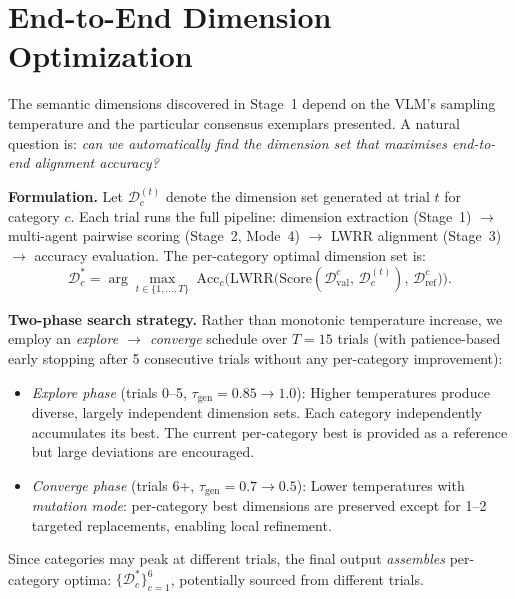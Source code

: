 \documentclass[runningheads]{llncs}
\begin{document}
\FloatBarrier
\section{End-to-End Dimension Optimization}
\label{sec:e2e}

The semantic dimensions discovered in Stage~1 depend on the VLM's sampling temperature and the particular consensus exemplars presented.
A natural question is: \emph{can we automatically find the dimension set that maximises end-to-end alignment accuracy?}

\smallskip\noindent\textbf{Formulation.}
Let $\mathcal{D}_c^{(t)}$ denote the dimension set generated at trial $t$ for category $c$.
Each trial runs the full pipeline: dimension extraction (Stage~1) $\to$ multi-agent pairwise scoring (Stage~2, Mode~4) $\to$ LWRR alignment (Stage~3) $\to$ accuracy evaluation.
The per-category optimal dimension set is:
\begin{equation}
\mathcal{D}_c^{*} = \arg\max_{t \in \{1,\ldots,T\}} \;\mathrm{Acc}_c\bigl(\text{LWRR}\bigl(\text{Score}(\mathcal{D}_{\mathrm{val}}^{c},\, \mathcal{D}_c^{(t)}),\, \mathcal{D}_{\mathrm{ref}}^{c}\bigr)\bigr).
\label{eq:e2e_supp}
\end{equation}

\smallskip\noindent\textbf{Two-phase search strategy.}
Rather than monotonic temperature increase, we employ an \emph{explore $\to$ converge} schedule over $T{=}15$ trials (with patience-based early stopping after 5 consecutive trials without any per-category improvement):
\begin{itemize}
    \item \emph{Explore phase} (trials 0--5, $\tau_{\mathrm{gen}}{=}0.85 \to 1.0$): Higher temperatures produce diverse, largely independent dimension sets. Each category independently accumulates its best. The current per-category best is provided as a reference but large deviations are encouraged.
    \item \emph{Converge phase} (trials 6+, $\tau_{\mathrm{gen}}{=}0.7 \to 0.5$): Lower temperatures with \emph{mutation mode}: per-category best dimensions are preserved except for 1--2 targeted replacements, enabling local refinement.
\end{itemize}
Since categories may peak at different trials, the final output \emph{assembles} per-category optima: $\{\mathcal{D}_c^{*}\}_{c=1}^{6}$, potentially sourced from different trials.
\end{document}
